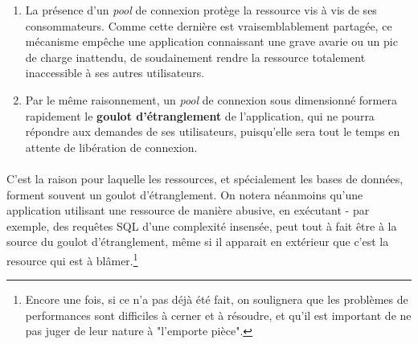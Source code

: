 {  \begin{enumerate}
    \item La présence d'un \textit{pool} de connexion protège la ressource vis à vis de ses
    consommateurs. Comme cette dernière est vraisemblablement partagée, ce mécanisme empêche une
    application connaissant une grave avarie ou un pic de charge inattendu, de soudainement rendre
    la ressource totalement inaccessible à ses autres utilisateurs.
    \item Par le même raisonnement, un \textit{pool} de connexion sous dimensionné formera
    rapidement le \textbf{goulot d'étranglement} de l'application, qui ne pourra répondre aux
    demandes de ses utilisateurs, puisqu'elle sera tout le temps en attente de libération de
    connexion.
  \end{enumerate}

  \paragraph{} C'est la raison pour laquelle les ressources, et spécialement les bases de données,
  forment souvent un goulot d'étranglement. On notera néanmoins qu'une application
  utilisant une ressource de manière abusive, en exécutant - par exemple, des requêtes SQL d'une
  complexité insensée, peut tout à fait être à la source du goulot d'étranglement, même si il
  apparait en extérieur que c'est la resource qui est à blâmer.\footnote{Encore une fois, si ce n'a
  pas déjà été fait, on soulignera que les problèmes de performances sont difficiles à cerner et à
  résoudre, et qu'il est important de ne pas juger de leur nature à "l'emporte pièce".}

}

